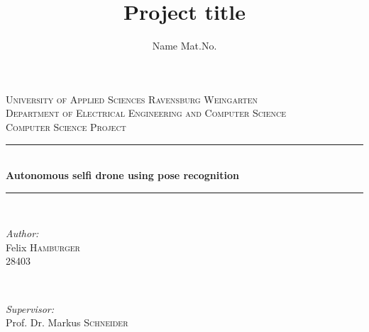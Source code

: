 \documentclass[a4paper,11pt,singlespacing]{article}
\title{Project title}
\author{
	Name Mat.No.
	}
\begin{document}
\setlength{\parindent}{0ex}


\begin{titlepage}
	
	\newcommand{\HRule}{\rule{\linewidth}{0.5mm}} %
	
	\center %
	
	
	\textsc{\LARGE University of Applied Sciences Ravensburg Weingarten}\\[1.5cm] %
	\textsc{\Large Department of
		Electrical Engineering
		and Computer Science}\\[0.5cm] %
	\textsc{\large Computer Science Project}\\[0.5cm] %
	
	
	\HRule \\[0.4cm]
	{ \huge \bfseries Autonomous selfi drone using pose recognition}\\[0.4cm] %
	\HRule \\[1.5cm]
	
	
	\begin{minipage}{0.4\textwidth}
		\begin{flushleft} \large
			\emph{Author:}\\
			Felix \textsc{Hamburger}\\ %
			28403
		\end{flushleft}
	\end{minipage}
	~
	\begin{minipage}{0.4\textwidth}
		\begin{flushright} \large
			\emph{Supervisor:} \\
			Prof. Dr. Markus \textsc{Schneider} %
		\end{flushright}
	\end{minipage}\\[2cm]


\end{titlepage}
\end{document}
